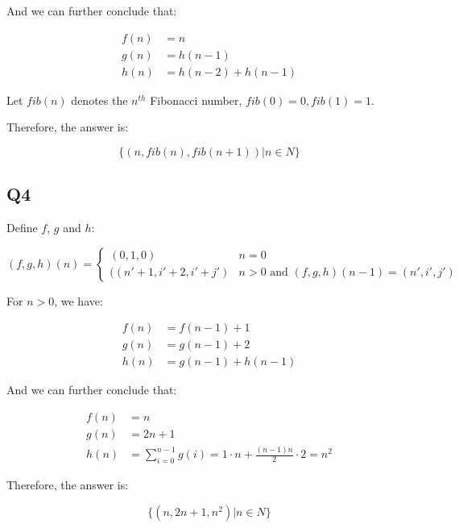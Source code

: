 \documentclass[11pt,a4paper]{article}
\begin{document}
And we can further conclude that:

\begin{align*}
    f(n) & = n \\
    g(n) & = h(n-1) \\
    h(n) & = h(n-2) + h(n-1)
\end{align*}

Let $fib(n)$ denotes the $n^{th}$ Fibonacci number, $fib(0) = 0, fib(1) = 1$.

Therefore, the answer is:

\begin{equation*}
    \{ (n,fib(n),fib(n+1)) | n \in N \}
\end{equation*}

\subsection{Q4}

Define $f$, $g$ and $h$:

\begin{equation*}
    (f, g, h)(n) =
    \begin{cases}
        (0,1,0) & n = 0 \\
        ((n'+1, i'+2, i'+j') & n > 0 \text{ and }
            (f,g,h)(n-1) = (n',i',j')
    \end{cases}
\end{equation*}

For $n > 0$, we have:

\begin{align*}
    f(n) & = f(n-1) + 1 \\
    g(n) & = g(n-1) + 2 \\
    h(n) & = g(n-1) + h(n-1)
\end{align*}

And we can further conclude that:

\begin{align*}
    f(n) & = n \\
    g(n) & = 2n+1 \\
    h(n) & = \sum_{i=0}^{n-1} g(i) = 1 \cdot n + \frac{(n-1)n}{2} \cdot 2 = n^2
\end{align*}

Therefore, the answer is:

\begin{equation*}
    \{ (n,2n+1,n^2) | n \in N \}
\end{equation*}
\end{document}
